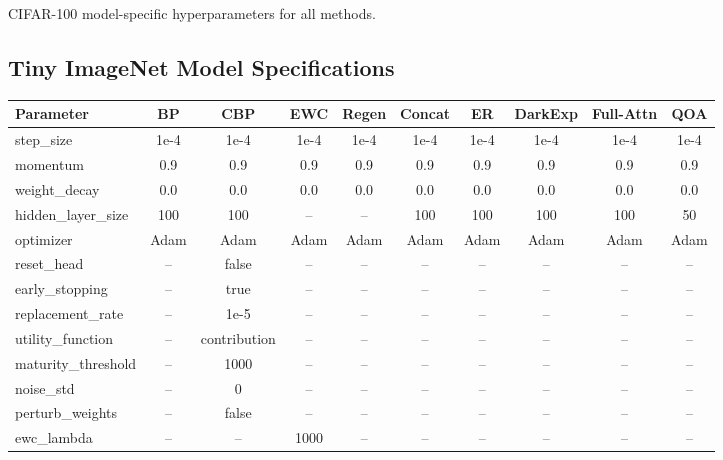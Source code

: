 \documentclass{article}
\begin{document}
\begin{minipage}{\columnwidth}
\caption{CIFAR-100 model-specific hyperparameters for all methods.}
\label{tab:cifar_model_specs}

\end{minipage}

\subsection{Tiny ImageNet Model Specifications}
\label{sec:cifar_model_specs}

\vspace{2mm}
\noindent
\begin{minipage}{\columnwidth}
\centering
\footnotesize
\setlength{\tabcolsep}{3pt}

\begin{tabular}{lccccccccc}
\toprule
\textbf{Parameter} & \textbf{BP} & \textbf{CBP} & \textbf{EWC} & \textbf{Regen} & \textbf{Concat} & \textbf{ER} & \textbf{DarkExp} & \textbf{Full-Attn} & \textbf{QOA} \\
\midrule
step\_size          & 1e-4 & 1e-4 & 1e-4 & 1e-4 & 1e-4 & 1e-4 & 1e-4 & 1e-4 & 1e-4 \\
momentum            & 0.9  & 0.9  & 0.9  & 0.9  & 0.9  & 0.9  & 0.9  & 0.9  & 0.9  \\
weight\_decay       & 0.0  & 0.0  & 0.0  & 0.0  & 0.0  & 0.0  & 0.0  & 0.0  & 0.0  \\
hidden\_layer\_size & 100  & 100  & --   & --   & 100  & 100  & 100  & 100  & 50   \\
optimizer              & Adam & Adam & Adam & Adam & Adam & Adam & Adam & Adam & Adam \\
\midrule
reset\_head         & --   & false & --  & --   & --   & --   & --   & --   & --   \\
early\_stopping     & --   & true  & --  & --   & --   & --   & --   & --   & --   \\
replacement\_rate   & --   & 1e-5  & --  & --   & --   & --   & --   & --   & --   \\
utility\_function   & --   & contribution & -- & -- & -- & -- & -- & -- & -- \\
maturity\_threshold & --   & 1000  & --  & --   & --   & --   & --   & --   & --   \\
noise\_std          & --   & 0     & --  & --   & --   & --   & --   & --   & --   \\
perturb\_weights    & --   & false & --  & --   & --   & --   & --   & --   & --   \\
\midrule
ewc\_lambda         & --   & --    & 1000 & --  & --   & --   & --   & --   & --   \\

\end{tabular}
\end{minipage}
\end{document}
